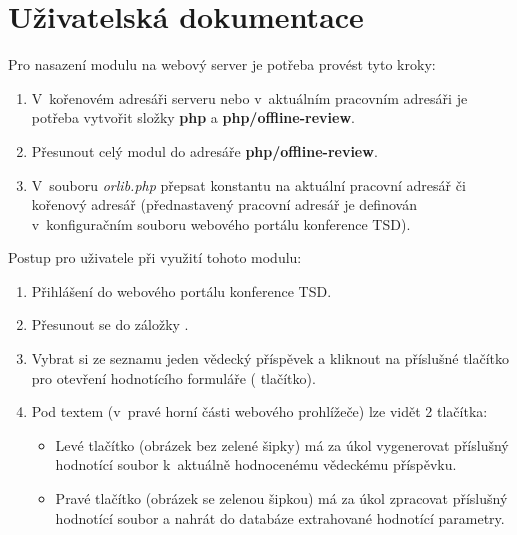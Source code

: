 \chapter{Uživatelská dokumentace}
Pro nasazení modulu na webový server je potřeba provést tyto kroky:
\begin{enumerate}
	\item V~kořenovém adresáři serveru nebo v~aktuálním pracovním adresáři je potřeba vytvořit složky \textbf{php} a \textbf{php/offline-review}.
	\item Přesunout celý modul do adresáře \textbf{php/offline-review}.
	\item V~souboru \textit{orlib.php} přepsat konstantu  na aktuální pracovní adresář či kořenový adresář (přednastavený pracovní adresář je definován v~konfiguračním souboru webového portálu konference TSD).
\end{enumerate}


Postup pro uživatele při využití tohoto modulu:
\begin{enumerate}
	\item Přihlášení do webového portálu konference TSD.
	\item Přesunout se do záložky .
	\item Vybrat si ze seznamu jeden vědecký příspěvek a kliknout na příslušné tlačítko pro otevření hodnotícího formuláře ( tlačítko).
	\item Pod textem  (v~pravé horní části webového prohlížeče) lze vidět 2 tlačítka:
	\begin{itemize}
		\item Levé tlačítko (obrázek bez zelené šipky) má za úkol vygenerovat příslušný hodnotící soubor k~aktuálně hodnocenému vědeckému příspěvku.
		\item Pravé tlačítko (obrázek se zelenou šipkou) má za úkol zpracovat příslušný hodnotící soubor a nahrát do databáze extrahované hodnotící parametry.
	\end{itemize}
\end{enumerate}
 